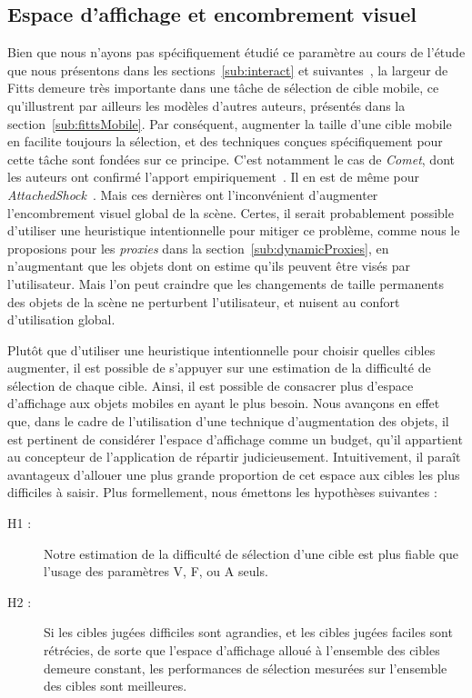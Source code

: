	
	\subsection{Espace d'affichage et encombrement visuel}
	Bien que nous n'ayons pas spécifiquement étudié ce paramètre au cours de l'étude que nous présentons dans les sections~\ref{sub:interact} et suivantes~\cite{kouyoumdjian2015characterizing}, la largeur de Fitts demeure très importante dans une tâche de sélection de cible mobile, ce qu'illustrent par ailleurs les modèles d'autres auteurs, présentés dans la section~\ref{sub:fittsMobile}. Par conséquent, augmenter la taille d'une cible mobile en facilite toujours la sélection, et des techniques conçues spécifiquement pour cette tâche sont fondées sur ce principe. C'est notamment le cas de \emph{Comet}, dont les auteurs ont confirmé l'apport empiriquement~\cite{hasan2011comet}. Il en est de même pour \emph{AttachedShock}~\cite{you2012attachedshock, you2014attachedshock}. Mais ces dernières ont l'inconvénient d'augmenter l'encombrement visuel global de la scène. Certes, il serait probablement possible d'utiliser une heuristique intentionnelle pour mitiger ce problème, comme nous le proposions pour les \emph{proxies} dans la section~\ref{sub:dynamicProxies}, en n'augmentant que les objets dont on estime qu'ils peuvent être visés par l'utilisateur. Mais l'on peut craindre que les changements de taille permanents des objets de la scène ne perturbent l'utilisateur, et nuisent au confort d'utilisation global.
	
	Plutôt que d'utiliser une heuristique intentionnelle pour choisir quelles cibles augmenter, il est possible de s'appuyer sur une estimation de la difficulté de sélection de chaque cible. Ainsi, il est possible de consacrer plus d'espace d'affichage aux objets mobiles en ayant le plus besoin. Nous avançons en effet que, dans le cadre de l'utilisation d'une technique d'augmentation des objets, il est pertinent de considérer l'espace d'affichage comme un budget, qu'il appartient au concepteur de l'application de répartir judicieusement. Intuitivement, il paraît avantageux d'allouer une plus grande proportion de cet espace aux cibles les plus difficiles à saisir. Plus formellement, nous émettons les hypothèses suivantes :
	
	\begin{description}
		\item[H1 :] Notre estimation de la difficulté de sélection d'une cible est plus fiable que l'usage des paramètres V, F, ou A seuls.
		\item[H2 :] Si les cibles jugées difficiles sont agrandies, et les cibles jugées faciles sont rétrécies, de sorte que l'espace d'affichage alloué à l'ensemble des cibles demeure constant, les performances de sélection mesurées sur l'ensemble des cibles sont meilleures.
	\end{description}
	
